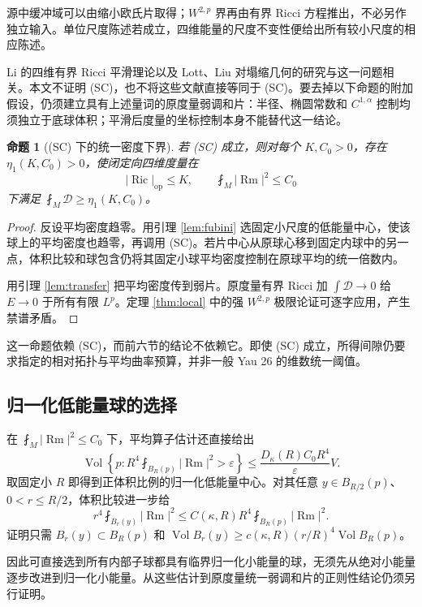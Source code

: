 \documentclass[UTF8,fontset=fandol,zihao=-4]{ctexart}
\theoremstyle{cn}
\newtheorem{proposition}[theorem]{命题}
\DeclareMathOperator{\Ric}{Ric}
\DeclareMathOperator{\Rm}{Rm}
\DeclareMathOperator{\Vol}{Vol}
\newcommand{\op}{\mathrm{op}}
\newcommand{\av}{\fint}
\newcommand{\Dcal}{\mathcal D}
\numberwithin{equation}{section}
\begin{document}
源中缓冲域可以由缩小欧氏片取得；$W^{2,p}$ 界再由有界 Ricci 方程推出，不必另作独立输入。单位尺度陈述若成立，四维能量的尺度不变性便给出所有较小尺度的相应陈述。

Li 的四维有界 Ricci 平滑理论以及 Lott、Liu 对塌缩几何的研究与这一问题相关\cite{li,lott,liu}。本文不证明 (SC)，也不将这些文献直接等同于 (SC)。要去掉以下命题的附加假设，仍须建立具有上述量词的原度量弱调和片：半径、椭圆常数和 $C^{1,\alpha}$ 控制均须独立于底球体积；平滑后度量的坐标控制本身不能替代这一结论。

\begin{proposition}[(SC) 下的统一密度下界]\label{prop:conditional}
若 (SC) 成立，则对每个 $K,C_0>0$，存在 $\eta_1(K,C_0)>0$，使闭定向四维度量在
\[
|\Ric|_{\op}\le K,\qquad\av_M|\Rm|^2\le C_0
\]
下满足 $\av_M\Dcal\ge\eta_1(K,C_0)$。
\end{proposition}
\begin{proof}
反设平均密度趋零。用引理 \ref{lem:fubini} 选固定小尺度的低能量中心，使该球上的平均密度也趋零，再调用 (SC)。若片中心从原球心移到固定内球中的另一点，体积比较和球包含仍将其固定小球平均密度控制在原球平均的统一倍数内。

用引理 \ref{lem:transfer} 把平均密度传到弱片。原度量有界 Ricci 加 $\int\Dcal\to0$ 给 $E\to0$ 于所有有限 $L^p$。定理 \ref{thm:local} 中的强 $W^{2,p}$ 极限论证可逐字应用，产生禁谱矛盾。
\end{proof}

这一命题依赖 (SC)，而前六节的结论不依赖它。即使 (SC) 成立，所得间隙仍要求指定的相对拓扑与平均曲率预算，并非一般 Yau 26 的维数统一阈值。

\subsection{归一化低能量球的选择}

在 $\av_M|\Rm|^2\le C_0$ 下，平均算子估计还直接给出
\begin{equation}\label{eq:normalized-choice}
\Vol\left\{p:R^4\av_{B_R(p)}|\Rm|^2>\varepsilon\right\}
\le\frac{D_\kappa(R)C_0R^4}{\varepsilon}V.
\end{equation}
取固定小 $R$ 即得到正体积比例的归一化低能量中心。对其任意 $y\in B_{R/2}(p)$、$0<r\le R/2$，体积比较进一步给
\begin{equation}\label{eq:subball}
r^4\av_{B_r(y)}|\Rm|^2
\le C(\kappa,R)R^4\av_{B_R(p)}|\Rm|^2.
\end{equation}
证明只需 $B_r(y)\subset B_R(p)$ 和
$\Vol B_r(y)\ge c(\kappa,R)(r/R)^4\Vol B_R(p)$。

因此可直接选到所有内部子球都具有临界归一化小能量的球，无须先从绝对小能量逐步改进到归一化小能量。从这些估计到原度量统一弱调和片的正则性结论仍须另行证明。
\end{document}
